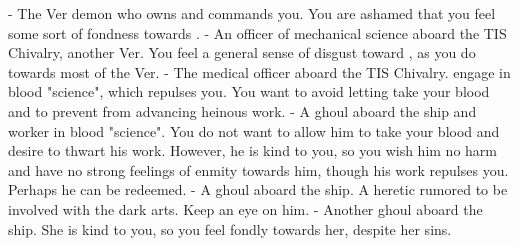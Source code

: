 \documentclass[char]{guildcamp4}
\begin{document}
\begin{itemz}[Notes]
	\item 
\end{itemz}

\begin{contacts}
	\contact{\cVone{}} - The Ver demon who owns and commands you. You are ashamed that you feel some sort of fondness towards \cVone{\them}.
	\contact{\cVtwo{}} - An officer of mechanical science aboard the TIS Chivalry, another Ver. You feel a general sense of disgust toward \cVtwo{\them}, as you do towards most of the Ver.
	\contact{\cVthree{}} - The medical officer aboard the TIS Chivalry. \cVthree{\They} engage in blood "science", which repulses you. You want to avoid letting \cVthree{\them} take your blood and to prevent \cVthree{\them} from advancing \cVthree{\their} heinous work.
	\contact{\cJames{}} - A ghoul aboard the ship and worker in blood "science". You do not want to allow him to take your blood and desire to thwart his work. However, he is kind to you, so you wish him no harm and have no strong feelings of enmity towards him, though his work repulses you. Perhaps he can be redeemed.
	\contact{\cRasputin{}} - A ghoul aboard the ship. A heretic rumored to be involved with the dark arts. Keep an eye on him.  
	\contact{\cJulie{}} - Another ghoul aboard the ship. She is kind to you, so you feel fondly towards her, despite her sins. 
\end{contacts}

\end{document}
